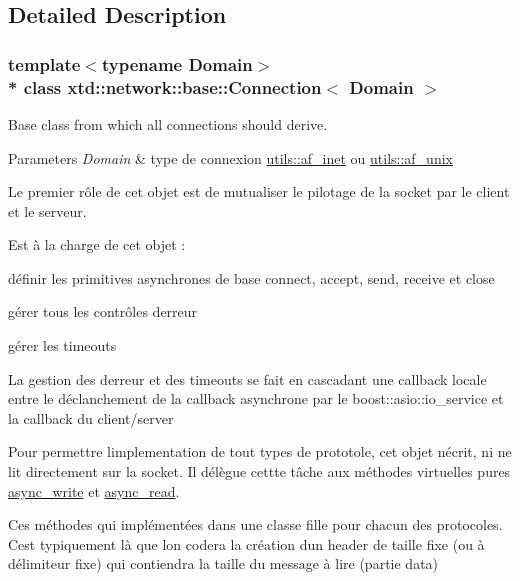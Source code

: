 \subsection{Detailed Description}
\subsubsection*{template$<$typename Domain$>$\\*
class xtd\+::network\+::base\+::\+Connection$<$ Domain $>$}

Base class from which all connections should derive. 


\begin{DoxyParams}{Parameters}
{\em Domain} & type de connexion \hyperlink{namespacextd_1_1network_1_1utils_a6238bab7a616eda8c9424721444a18d1}{utils\+::af\+\_\+inet} ou \hyperlink{namespacextd_1_1network_1_1utils_a60e83921a2d026f07b49fa094988acdf}{utils\+::af\+\_\+unix}\\
\hline
\end{DoxyParams}
Le premier rôle de cet objet est de mutualiser le pilotage de la socket par le client et le serveur.

Est à la charge de cet objet \+:
\begin{DoxyItemize}
\item définir les primitives asynchrones de base connect, accept, send, receive et close
\item gérer tous les contrôles d\textquotesingle{}erreur
\item gérer les timeouts
\end{DoxyItemize}

La gestion des d\textquotesingle{}erreur et des timeouts se fait en cascadant une callback locale entre le déclanchement de la callback asynchrone par le boost\+::asio\+::io\+\_\+service et la callback du client/server

Pour permettre l\textquotesingle{}implementation de tout types de prototole, cet objet n\textquotesingle{}écrit, ni ne lit directement sur la socket. Il délègue cettte tâche aux méthodes virtuelles pures \hyperlink{classxtd_1_1network_1_1base_1_1Connection_a650bc7e13969ff9195c95307e0abb2e4}{async\+\_\+write} et \hyperlink{classxtd_1_1network_1_1base_1_1Connection_ab468f8470260b0ce42b5accf29c352e6}{async\+\_\+read}.

Ces méthodes qui implémentées dans une classe fille pour chacun des protocoles. C\textquotesingle{}est typiquement là que l\textquotesingle{}on codera la création d\textquotesingle{}un header de taille fixe (ou à délimiteur fixe) qui contiendra la taille du message à lire (partie data)


